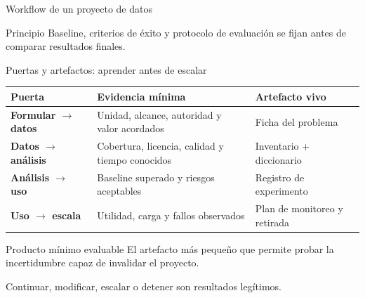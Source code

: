 \documentclass[aspectratio=169,11pt]{beamer}
\newcommand{\br}{\\}
\begin{document}
\begin{frame}{Workflow de un proyecto de datos}
  \centering
  \vfill
  \begin{block}{Principio}
    Baseline, criterios de éxito y protocolo de evaluación se fijan antes de comparar resultados finales.
  \end{block}
\end{frame}

\begin{frame}{Puertas y artefactos: aprender antes de escalar}
  \small
  \begin{tabularx}{\textwidth}{>{\bfseries}p{} X X}
    \toprule
    Puerta & Evidencia mínima & Artefacto vivo \\
    \midrule
    Formular $\rightarrow$ datos & Unidad, alcance, autoridad y valor acordados & Ficha del problema \\
    Datos $\rightarrow$ análisis & Cobertura, licencia, calidad y tiempo conocidos & Inventario + diccionario \\
    Análisis $\rightarrow$ uso & Baseline superado y riesgos aceptables & Registro de experimento \\
    Uso $\rightarrow$ escala & Utilidad, carga y fallos observados & Plan de monitoreo y retirada \\
    \bottomrule
  \end{tabularx}
  \vfill
  \begin{block}{Producto mínimo evaluable}
    El artefacto más pequeño que permite probar la incertidumbre capaz de invalidar el proyecto.
  \end{block}
  \centering\alert{Continuar, modificar, escalar o detener son resultados legítimos.}
\end{frame}
\end{document}
